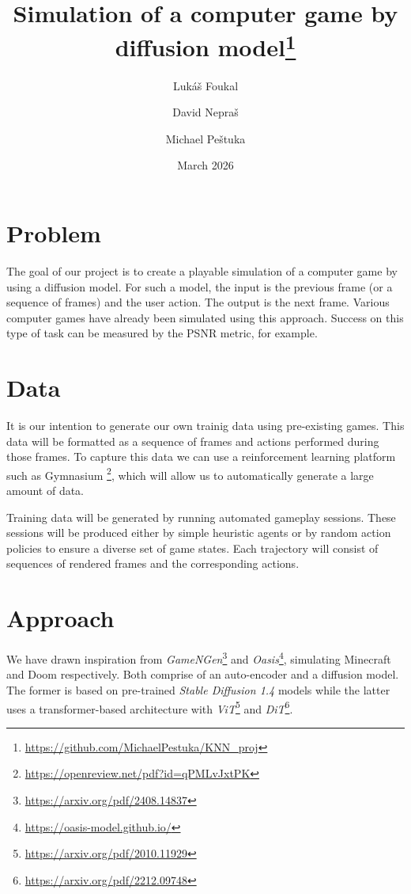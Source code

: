 \documentclass[twocolumn,a4paper]{article}
\title{Simulation of a computer game by diffusion model\footnote{\url{https://github.com/MichaelPestuka/KNN_proj}}}
\author{
  Lukáš Foukal \and
  David Nepraš \and
  Michael Peštuka
}
\date{March 2026}
\begin{document}
\maketitle


\section{Problem}
The goal of our project is to create a playable simulation of a computer game by using a diffusion model. For such a model, the input is the previous frame (or a sequence of frames) and the user action. The output is the next frame. Various computer games have already been simulated using this approach. Success on this type of task can be measured by the PSNR metric, for example.

\section{Data}
It is our intention to generate our own trainig data using pre-existing games. This data will be formatted as a sequence of frames and actions performed during those frames. To capture this data we can use a reinforcement learning platform such as Gymnasium \footnote{\url{https://openreview.net/pdf?id=qPMLvJxtPK}}, which will allow us to automatically generate a large amount of data.

Training data will be generated by running automated gameplay sessions. These sessions will be produced either by simple heuristic agents or by random action policies to ensure a diverse set of game states. Each trajectory will consist of sequences of rendered frames and the corresponding actions.

\section{Approach}

We have drawn inspiration from \textit{GameNGen}\footnote{\url{https://arxiv.org/pdf/2408.14837}} and \textit{Oasis}\footnote{\url{https://oasis-model.github.io/}}, simulating Minecraft and Doom respectively. Both comprise of an auto-encoder and a diffusion model. The former is based on pre-trained \textit{Stable Diffusion 1.4} models while the latter uses a transformer-based architecture with \textit{ViT}\footnote{\url{https://arxiv.org/pdf/2010.11929}} and \textit{DiT}\footnote{\url{https://arxiv.org/pdf/2212.09748}}.
\end{document}
